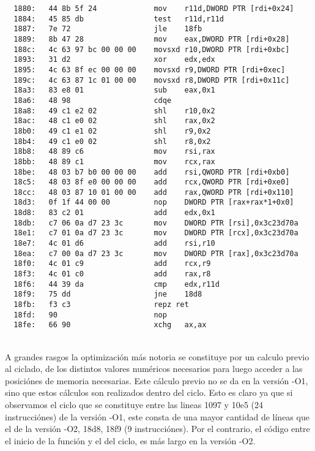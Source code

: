 {}
\begin{lstlisting}
  1880:   44 8b 5f 24             mov    r11d,DWORD PTR [rdi+0x24]
  1884:   45 85 db                test   r11d,r11d
  1887:   7e 72                   jle    18fb
  1889:   8b 47 28                mov    eax,DWORD PTR [rdi+0x28]
  188c:   4c 63 97 bc 00 00 00    movsxd r10,DWORD PTR [rdi+0xbc]
  1893:   31 d2                   xor    edx,edx
  1895:   4c 63 8f ec 00 00 00    movsxd r9,DWORD PTR [rdi+0xec]
  189c:   4c 63 87 1c 01 00 00    movsxd r8,DWORD PTR [rdi+0x11c]
  18a3:   83 e8 01                sub    eax,0x1
  18a6:   48 98                   cdqe   
  18a8:   49 c1 e2 02             shl    r10,0x2
  18ac:   48 c1 e0 02             shl    rax,0x2
  18b0:   49 c1 e1 02             shl    r9,0x2
  18b4:   49 c1 e0 02             shl    r8,0x2
  18b8:   48 89 c6                mov    rsi,rax
  18bb:   48 89 c1                mov    rcx,rax
  18be:   48 03 b7 b0 00 00 00    add    rsi,QWORD PTR [rdi+0xb0]
  18c5:   48 03 8f e0 00 00 00    add    rcx,QWORD PTR [rdi+0xe0]
  18cc:   48 03 87 10 01 00 00    add    rax,QWORD PTR [rdi+0x110]
  18d3:   0f 1f 44 00 00          nop    DWORD PTR [rax+rax*1+0x0]
  18d8:   83 c2 01                add    edx,0x1
  18db:   c7 06 0a d7 23 3c       mov    DWORD PTR [rsi],0x3c23d70a
  18e1:   c7 01 0a d7 23 3c       mov    DWORD PTR [rcx],0x3c23d70a
  18e7:   4c 01 d6                add    rsi,r10
  18ea:   c7 00 0a d7 23 3c       mov    DWORD PTR [rax],0x3c23d70a
  18f0:   4c 01 c9                add    rcx,r9
  18f3:   4c 01 c0                add    rax,r8
  18f6:   44 39 da                cmp    edx,r11d
  18f9:   75 dd                   jne    18d8
  18fb:   f3 c3                   repz ret 
  18fd:   90                      nop
  18fe:   66 90                   xchg   ax,ax
\end{lstlisting}


~\\
A grandes rasgos la optimización más notoria se constituye por un calculo previo al ciclado, de los distintos valores numéricos necesarios para luego acceder a las posiciónes de memoria necesarias. Este cálculo previo no se da en la versión -O1, sino que estos cálculos son realizados dentro del ciclo. Esto es claro ya que si observamos el ciclo que se constituye entre las lineas 1097 y 10e5 (24 instrucciónes) de la versión -O1, este consta de una mayor cantidad de líneas que el de la versión -O2, 18d8, 18f9 (9 instrucciónes). Por el contrario, el código entre el inicio de la función y el del ciclo, es más largo en la versión -O2. 

